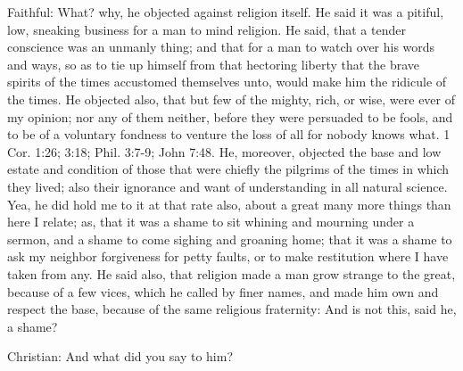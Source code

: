 Faithful: What? why, he objected against religion itself. He said it was a pitiful, low, sneaking business for a man to mind religion. He said, that a tender conscience was an unmanly thing; and that for a man to watch over his words and ways, so as to tie up himself from that hectoring liberty that the brave spirits of the times accustomed themselves unto, would make him the ridicule of the times. He objected also, that but few of the mighty, rich, or wise, were ever of my opinion; nor any of them neither, before they were persuaded to be fools, and to be of a voluntary fondness to venture the loss of all for nobody knows what. 1 Cor. 1:26; 3:18; Phil. 3:7-9; John 7:48. He, moreover, objected the base and low estate and condition of those that were chiefly the pilgrims of the times in which they lived; also their ignorance and want of understanding in all natural science. Yea, he did hold me to it at that rate also, about a great many more things than here I relate; as, that it was a shame to sit whining and mourning under a sermon, and a shame to come sighing and groaning home; that it was a shame to ask my neighbor forgiveness for petty faults, or to make restitution where I have taken from any. He said also, that religion made a man grow strange to the great, because of a few vices, which he called by finer names, and made him own and respect the base, because of the same religious fraternity: And is not this, said he, a shame?

Christian: And what did you say to him?

